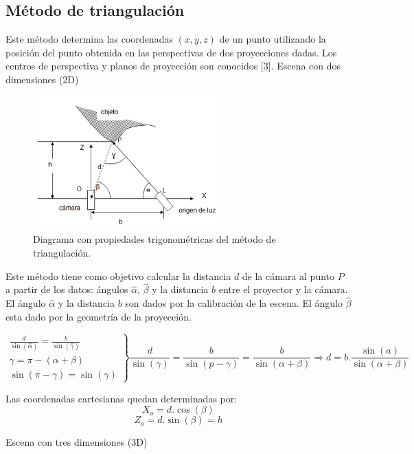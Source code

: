 \subsection{Método de triangulación}
Este método determina las coordenadas $(x,y,z)$ de un punto utilizando la posición del punto obtenida en las perspectivas de dos proyecciones dadas.
Los centros de perspectiva y planos de proyección son conocidos [3].%
Escena con dos dimensiones (2D)

\begin{figure}[H]
  \centering
    \includegraphics[width=0.65\textwidth]{./Cap6_reconstruccion/triangulacion.PNG}
  \caption{Diagrama con propiedades trigonométricas del método de triangulación.}
  \label{fig:Triangulacion}
\end{figure}

Este método tiene como objetivo calcular la distancia $d$ de la cámara al punto $P$ a partir de los datos: ángulos $\hat\alpha$, $\hat\beta$ y la distancia $b$ entre el proyector y la cámara.
El ángulo $\hat\alpha$ y la distancia $b$ son dados por la calibración de la escena.
El ángulo $\hat\beta$ esta dado por la geometría de la proyección.

\[
\left.
\begin{array}{l}
\frac{d}{\sin (\hat\alpha)} = \frac{b}{\sin (\hat\gamma)} 	\\
\gamma = \pi - (\alpha + \beta)								\\
\sin (\pi - \gamma) = \sin (\gamma)
\end{array}
\right \rbrace
\frac{d}{\sin(\gamma)} = \frac{b}{\sin(p - \gamma)} = \frac{b}{\sin(\alpha + \beta)} \Rightarrow d = b . \frac{\sin(a)}{\sin(\alpha + \beta)}
\]

Las coordenadas cartesianas quedan determinadas por:
\[
X_o = d. \cos (\beta)
\]
\[
Z_o = d. \sin (\beta) = h
\]

Escena con tres dimensiones (3D)

